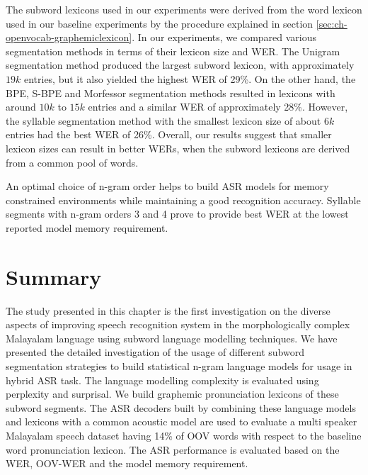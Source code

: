 The subword lexicons used in our experiments were derived from the word lexicon used in our baseline experiments by the procedure explained in section \ref{sec:ch-openvocab-graphemiclexicon}. In our experiments, we compared various segmentation methods in terms of their lexicon size and WER. The Unigram segmentation method produced the largest subword lexicon, with approximately $19k$ entries, but it also yielded the highest WER of 29\%. On the other hand, the BPE, S-BPE and Morfessor segmentation methods resulted in lexicons with around $10k$ to $15k$ entries and a similar WER of approximately 28\%. However, the syllable segmentation method with the smallest lexicon size of about $6k$ entries had the best WER of 26\%. Overall, our results suggest that smaller lexicon sizes can result in better WERs, when the subword lexicons are derived from a common pool of words. 


An optimal choice of n-gram order helps to build ASR models for memory
constrained environments while maintaining a good recognition accuracy.
Syllable segments with n-gram orders 3 and 4 prove to provide best WER at the
lowest reported model memory requirement.


\section{Summary}

The  study presented in this chapter is the first investigation on the diverse aspects of improving speech recognition system in the morphologically complex Malayalam language using subword language modelling techniques. We have presented the detailed investigation of the usage of different subword segmentation strategies to build statistical n-gram language models for usage in hybrid ASR task. The language modelling complexity is evaluated using perplexity and surprisal. We build graphemic pronunciation lexicons of these subword segments. The ASR decoders built by combining these language models and lexicons with a common acoustic model are used to evaluate a multi speaker Malayalam speech dataset having 14\% of OOV words with respect to the baseline word pronunciation lexicon. The ASR performance is evaluated based on the WER, OOV-WER and the model memory requirement. 

